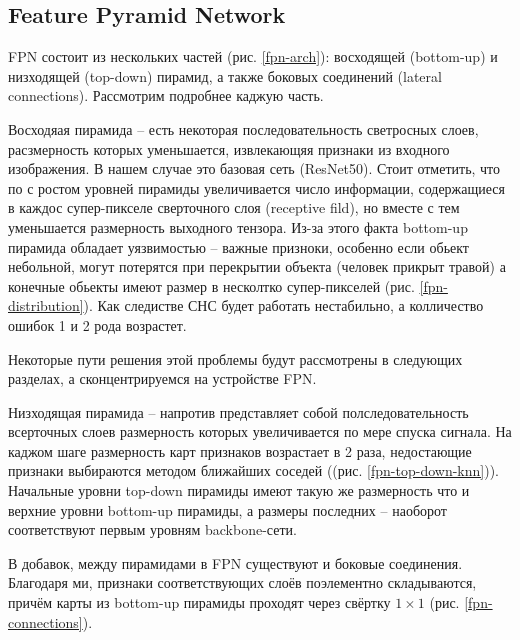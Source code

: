 \subsection{Feature Pyramid Network} \label{sect-5-2}

FPN состоит из нескольких частей (рис. \ref{fpn-arch}): восходящей (bottom-up) и низходящей (top-down) пирамид, а также боковых соединений (lateral connections). Рассмотрим подробнее каджую часть.


Восходяая пирамида -- есть некоторая последовательность светросных слоев, расзмерность которых уменьшается, извлекающяя признаки из входного изображения. В нашем случае это базовая сеть (ResNet50). Стоит отметить, что по с ростом уровней пирамиды увеличивается число информации, содержащиеся в каждос супер-пикселе сверточного слоя (receptive fild), но вместе с тем уменьшается размерность выходного тензора. 
Из-за этого факта bottom-up пирамида обладает уязвимостью -- важные призноки, особенно если обьект небольной, могут потерятся при перекрытии объекта (человек прикрыт травой) а конечные обьекты имеют размер в несколтко супер-пикселей (рис. \ref{fpn-distribution}). Как следистве СНС будет работать нестабильно, а колличество ошибок 1 и 2 рода возрастет. 


Некоторые пути решения этой проблемы будут рассмотрены в следующих разделах, а сконцентрируемся на устройстве FPN.

Низходящая пирамида -- напротив представляет собой полследовательность всерточных слоев размерность которых увеличивается по мере спуска сигнала. На каджом шаге размерность карт признаков возрастает в 2 раза, недостающие признаки выбираются методом ближайших соседей ((рис. \ref{fpn-top-down-knn})). Начальные уровни top-down пирамиды имеют такую же размерность что и верхние уровни bottom-up пирамиды, а размеры последних -- наоборот соответствуют первым уровням backbone-сети.


В добавок, между пирамидами в FPN существуют и боковые соединения. Благодаря ми, признаки соответствующих слоёв поэлементно складываются, причём карты из bottom-up пирамиды проходят через свёртку $1 \times 1$ (рис. \ref{fpn-connections}).

